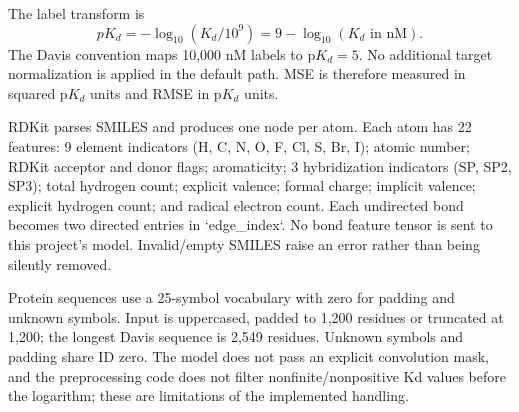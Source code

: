 The label transform is
\begin{equation}\label{eq:pkd}pK_d=-\log_{10}(K_d/10^9)=9-\log_{10}(K_d\text{ in nM}).\end{equation}
The Davis convention maps 10,000 nM labels to p$K_d=5$. No additional target normalization is applied in the default path. MSE is therefore measured in squared p$K_d$ units and RMSE in p$K_d$ units.

RDKit parses SMILES and produces one node per atom. Each atom has 22 features: 9 element indicators (H, C, N, O, F, Cl, S, Br, I); atomic number; RDKit acceptor and donor flags; aromaticity; 3 hybridization indicators (SP, SP2, SP3); total hydrogen count; explicit valence; formal charge; implicit valence; explicit hydrogen count; and radical electron count. Each undirected bond becomes two directed entries in `edge_index`. No bond feature tensor is sent to this project’s model. Invalid/empty SMILES raise an error rather than being silently removed.

Protein sequences use a 25-symbol vocabulary with zero for padding and unknown symbols. Input is uppercased, padded to 1,200 residues or truncated at 1,200; the longest Davis sequence is 2,549 residues. Unknown symbols and padding share ID zero. The model does not pass an explicit convolution mask, and the preprocessing code does not filter nonfinite/nonpositive Kd values before the logarithm; these are limitations of the implemented handling.


